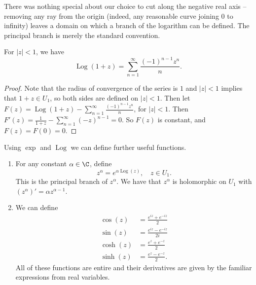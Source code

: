 \begin{center}
\end{center}

There was nothing special about our choice to cut along the negative real axis -- removing any ray from the origin (indeed, any reasonable curve joining $0$ to infinity) leaves a domain on which a branch of the logarithm can be defined. The principal branch is merely the standard convention.

\begin{proposition}
    For $|z| < 1$, we have
    $$
    \operatorname{Log}(1 + z)=\sum_{n=1}^{\infty} \frac{(-1)^{n-1} z^{n}}{n}.
    $$
\end{proposition}
\begin{proof}
    Note that the radius of convergence of the series is $1$ and $|z| < 1$ implies that $1 + z \in U_1$, so both sides are defined on $|z| < 1$. Then let $F(z) = \operatorname{Log}(1 + z) - \sum_{n=1}^{\infty} \frac{(-1)^{n-1} z^{n}}{n}$, for $|z| < 1$. Then $F'(z) = \frac{1}{1 + z} - \sum_{n = 1}^{\infty} (-z)^{n - 1} = 0$. So $F(z)$ is constant, and $F(z) = F(0) = 0$.
\end{proof}

Using $\exp$ and $\operatorname{Log}$ we can define further useful functions.

\begin{enumerate}[label=(\roman*)]
    \item For any constant $\alpha \in \C$, define
    $$
    z^{\alpha} = e^{\alpha \operatorname{Log}(z)}, \quad z \in U_1.
    $$
    This is the principal branch of $z^\alpha$. We have that $z^{\alpha}$ is holomorphic on $U_1$ with $(z^{\alpha})' = \alpha z^{\alpha - 1}$.

    \item We can define
    \begin{align*}
        \cos(z) &= \frac{e^{iz} + e^{-iz}}{2}\\ 
        \sin(z) &= \frac{e^{iz} - e^{-iz}}{2i}\\
        \cosh(z) &= \frac{e^{z} + e^{-z}}{2} \\
        \sinh(z) &= \frac{e^z - e^{-z}}{2}.
    \end{align*}
    All of these functions are entire and their derivatives are given by the familiar expressions from real variables.
\end{enumerate}

